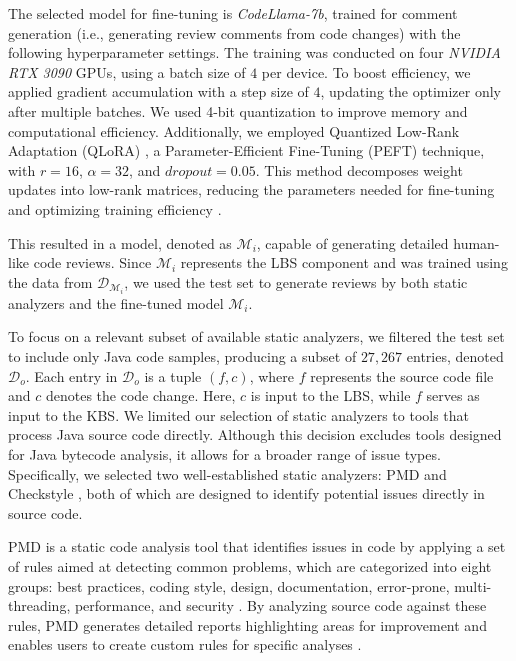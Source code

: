 The selected model for fine-tuning is \emph{CodeLlama-7b}, trained for comment generation (i.e., generating review comments from code changes) with the following hyperparameter settings. The training was conducted on four \emph{NVIDIA RTX 3090} GPUs, using a batch size of $4$ per device. To boost efficiency, we applied gradient accumulation with a step size of $4$, updating the optimizer only after multiple batches. We used 4-bit quantization to improve memory and computational efficiency. Additionally, we employed Quantized Low-Rank Adaptation (QLoRA) \cite{hu2021lora}, a Parameter-Efficient Fine-Tuning (PEFT) technique, with $r = 16$, $\alpha = 32$, and $dropout = 0.05$. This method decomposes weight updates into low-rank matrices, reducing the parameters needed for fine-tuning and optimizing training efficiency \cite{hu2021lora}.

This resulted in a model, denoted as \(\mathcal{M}_i\), capable of generating detailed human-like code reviews.
Since \(\mathcal{M}_i\) represents the LBS component and was trained using the data from \(\mathcal{D}_{\mathcal{M}_i}\), we used the test set to generate reviews by both static analyzers and the fine-tuned model \(\mathcal{M}_i\).

To focus on a relevant subset of available static analyzers, we filtered the test set to include only Java code samples, producing a subset of $27,267$ entries, denoted \(\mathcal{D}_o\). Each entry in \(\mathcal{D}_o\) is a tuple \( (f,c) \), where \( f \) represents the source code file and \( c \) denotes the code change. Here, \( c \) is input to the LBS, while \( f \) serves as input to the KBS.
We limited our selection of static analyzers to tools that process Java source code directly. Although this decision excludes tools designed for Java bytecode analysis, it allows for a broader range of issue types. Specifically, we selected two well-established static analyzers: PMD \cite{pmd} and Checkstyle \cite{checkstyle}, both of which are designed to identify potential issues directly in source code.

PMD is a static code analysis tool that identifies issues in code by applying a set of rules aimed at detecting common problems, which are categorized into eight groups: best practices, coding style, design, documentation, error-prone, multi-threading, performance, and security \cite{lenarduzzi2023critical}. By analyzing source code against these rules, PMD generates detailed reports highlighting areas for improvement and enables users to create custom rules for specific analyses \cite{oskouei2018comparing}.

